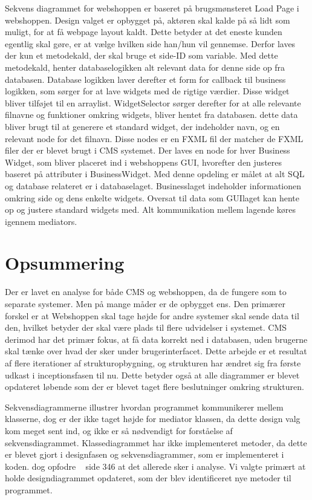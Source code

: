 Sekvens diagrammet for webshoppen er baseret på brugsmønsteret Load Page i webshoppen. Design valget er opbygget på, aktøren skal kalde på så lidt som muligt, for at få webpage layout kaldt. Dette betyder at det eneste kunden egentlig skal gøre, er at vælge hvilken side han/hun vil gennemse. Derfor laves der kun et metodekald, der skal bruge et side-ID som variable. Med dette metodekald, henter databaselogikken  alt relevant data for denne side op fra databasen. Database logikken laver derefter et form for callback til business logikken, som sørger for at lave widgets med de rigtige værdier. Disse widget bliver tilføjet til en arraylist. WidgetSelector sørger derefter for at alle relevante filnavne og funktioner omkring widgets, bliver hentet fra databasen. dette data bliver brugt til at generere et standard widget, der indeholder navn, og en relevant node for det filnavn. Disse nodes er en FXML fil der matcher de FXML filer der er blevet brugt i CMS systemet. Der laves en node for hver Business Widget, som bliver placeret ind i webshoppens GUI, hvorefter den justeres baseret på attributer i BusinessWidget. Med denne opdeling er målet at alt SQL og database relateret er i databaselaget. Businesslaget indeholder informationen omkring side og dens enkelte widgets. Oversat til data som GUIlaget kan hente op og justere standard widgets med. Alt kommunikation mellem lagende køres igennem mediators. %

\clearpage
\section{Opsummering}

Der er lavet en analyse for både CMS og webshoppen, da de fungere som to separate systemer. Men på mange måder er de opbygget ens. Den primærer forskel er at Webshoppen skal tage højde for andre systemer skal sende data til den, hvilket betyder der skal være plads til flere udvidelser i systemet. CMS derimod har det primær fokus, at få data korrekt ned i databasen, uden brugerne skal tænke over hvad der sker under brugerinterfacet. 
Dette arbejde er et resultat af flere iterationer af strukturopbygning, og strukturen har ændret sig fra første udkast i inceptionsfasen til nu. Dette betyder også at alle diagrammer er blevet opdateret løbende som der er blevet taget flere beslutninger omkring strukturen.

Sekvensdiagrammerne illustrer hvordan programmet kommunikerer mellem klasserne, dog er der ikke taget højde for mediator klassen, da dette design valg kom meget sent ind, og ikke er så nødvendigt for forståelse af sekvensdiagrammet.
Klassediagrammet har ikke implementeret metoder, da dette er blevet gjort i designfasen og sekvensdiagrammer, som er implementeret i koden. dog opfodre ~\cite{A&N} side 346 at det allerede sker i analyse. Vi valgte primært at holde designdiagrammet opdateret, som der blev identificeret nye metoder til programmet.


\FloatBarrier